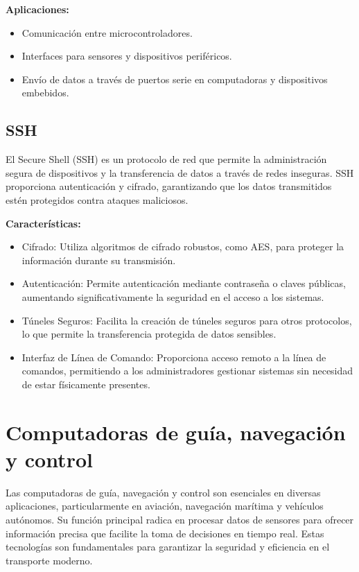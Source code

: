 \textbf{Aplicaciones:}

\begin{itemize}
    \item Comunicación entre microcontroladores.
    \item Interfaces para sensores y dispositivos periféricos.
    \item Envío de datos a través de puertos serie en computadoras y dispositivos embebidos.
\end{itemize}

\subsection{SSH}

El Secure Shell (SSH) es un protocolo de red que permite la administración segura de dispositivos y la transferencia de datos a través de redes inseguras. SSH proporciona autenticación y cifrado, garantizando que los datos transmitidos estén protegidos contra ataques maliciosos.

\textbf{Características:}

\begin{itemize}
    \item Cifrado: Utiliza algoritmos de cifrado robustos, como AES, para proteger la información durante su transmisión.
    \item Autenticación: Permite autenticación mediante contraseña o claves públicas, aumentando significativamente la seguridad en el acceso a los sistemas.
    \item Túneles Seguros: Facilita la creación de túneles seguros para otros protocolos, lo que permite la transferencia protegida de datos sensibles.
    \item Interfaz de Línea de Comando: Proporciona acceso remoto a la línea de comandos, permitiendo a los administradores gestionar sistemas sin necesidad de estar físicamente presentes.
\end{itemize}

\section{Computadoras de guía, navegación y control}

Las computadoras de guía, navegación y control son esenciales en diversas aplicaciones, particularmente en aviación, navegación marítima y vehículos autónomos. Su función principal radica en procesar datos de sensores para ofrecer información precisa que facilite la toma de decisiones en tiempo real. Estas tecnologías son fundamentales para garantizar la seguridad y eficiencia en el transporte moderno.

